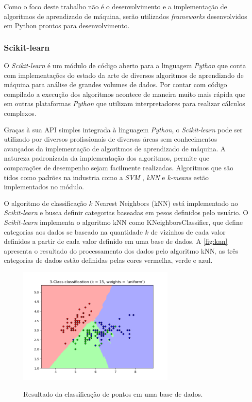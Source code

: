 Como o foco deste trabalho não é o desenvolvimento e a implementação de algoritmos de aprendizado de máquina, serão utilizados \textit{frameworks} desenvolvidos em Python prontos para desenvolvimento. 

\subsubsection{Scikit-learn}

O \textit{Scikit-learn} é um módulo de código aberto para a linguagem \textit{Python} que conta com implementações do estado da arte de diversos algoritmos de aprendizado de máquina para análise de grandes volumes de dados. Por contar com código compilado a execução dos algoritmos acontece de maneira muito mais rápida que em outras plataformas \textit{Python} que utilizam interpretadores para realizar cálculos complexos. \cite{scikit-learn} 

Graças à sua API simples integrada à linguagem \textit{Python}, o \textit{Scikit-learn} pode ser utilizado por diversos profissionais de diversas áreas sem conhecimentos avançados da implementação de algoritmos de aprendizado de máquina. A natureza padronizada da implementação dos algoritmos, permite que comparações de desempenho sejam facilmente realizadas. Algoritmos que são tidos como padrões na industria como a \textit{SVM} \cite{cortes:1995svm}, \textit{kNN} \cite{cover:1967knn} e \textit{k-means} \cite{macqueen:1967kmeans} estão implementados no módulo. \cite{scikit-learn}

O algoritmo de classificação $k$ Nearest Neighbors (kNN) está implementado no \textit{Scikit-learn} e busca definir categorias baseadas em pesos definidos pelo usuário. O \textit{Scikit-learn} implementa o algoritmo kNN como KNeighborsClassifier, que define categorias aos dados se baseado na quantidade $k$ de vizinhos de cada valor definidos a partir de cada valor definido em uma base de dados. A \autoref{fig:knn} apresenta o resultado do processamento dos dados pelo algoritmo kNN, as três categorias de dados estão definidas pelas cores vermelha, verde e azul.

\begin{figure}[ht]
    \centering
    \caption{Resultado da classificação de pontos em uma base de dados.}
    \includegraphics[width=0.7\textwidth, keepaspectratio]{resources/knn.png}
    \label{fig:knn}
\end{figure}

